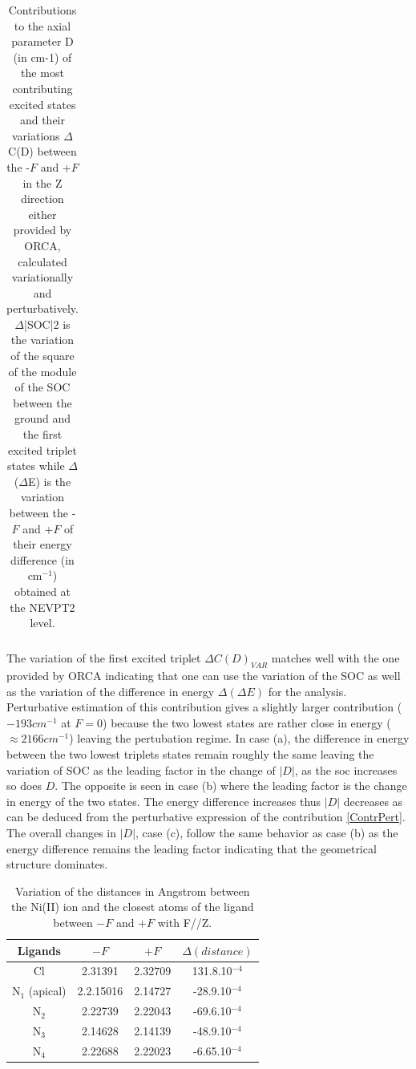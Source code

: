 \documentclass[10pt]{report}
\numberwithin{equation}{section}
\begin{document}
\begin{table}[h]
{\begin{tabular}{c | c | c  c | c c c |c |c}
    \hline
    \end{tabular}
    }
    \caption{Contributions to the axial parameter D (in cm-1) of the most contributing excited states and their variations $\Delta$C(D) between the -$F$ and +$F$ in the Z direction either provided by ORCA, calculated variationally and perturbatively. $\Delta$|SOC|2 is the variation of the square of the module of the SOC between the ground and the first excited triplet states while $\Delta$($\Delta$E) is the variation between the -$F$ and +$F$ of their energy difference (in cm$^{-1}$) obtained at the NEVPT2 level.}
    \label{tab:Contribution_Z}
\end{table}

The variation of the first excited triplet $\Delta C(D)_{VAR}$ matches well with the one provided by ORCA indicating that one can use the variation of the SOC as well as the variation of the difference in energy $\Delta (\Delta E)$ for the analysis.
Perturbative estimation of this contribution gives a slightly larger contribution ($-193 cm^{-1}$ at $F=0$) because the two lowest states are rather close in energy ($\approx 2166 cm^{-1}$) leaving the pertubation regime.
In case (a), the difference in energy between the two lowest triplets states remain roughly the same leaving the variation of SOC as the leading factor in the change of $|D|$, as the soc increases so does $D$.
The opposite is seen in case (b) where the leading factor is the change in energy of the two states. 
The energy difference increases thus $|D|$ decreases as can be deduced from the perturbative expression of the contribution \ref{ContrPert}.
The overall changes in $|D|$, case (c), follow the same behavior as case (b) as the energy difference remains the leading factor indicating that the geometrical structure dominates.
\begin{table}[h!]
    \centering
    \begin{tabular}{| c | c| c | c |}
        \hline
        Ligands & $-F$ & $+F$ &$\Delta(distance)$\\
        \hline
        Cl & 2.31391& 2.32709&  131.8.10$^{-4}$\\
        N$_1$ (apical) & 2.2.15016  & 2.14727 &-28.9.10$^{-4}$\\
        N$_2$ & 2.22739 & 2.22043&-69.6.10$^{-4}$ \\
        N$_3$ & 2.14628& 2.14139&-48.9.10$^{-4}$ \\
        N$_4$ & 2.22688 & 2.22023 &-6.65.10$^{-4}$\\
        \hline
    \end{tabular}
    \caption{Variation of the distances in Angstrom between the Ni(II) ion and the closest atoms of the ligand between $-F$ and $+F$ with F//Z.}
    \label{tab:DistanceZ}
\end{table}
\end{document}
